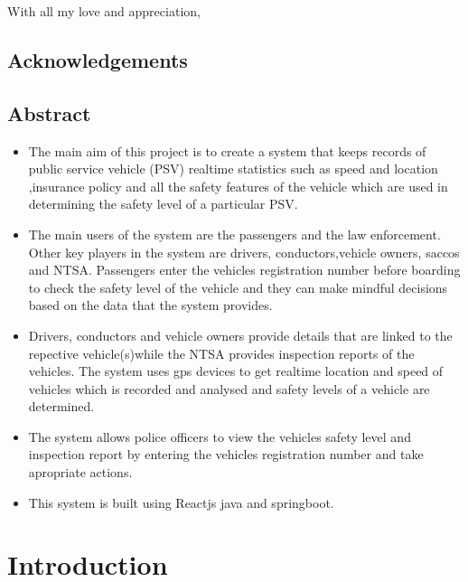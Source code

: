 \documentclass[a4paper, 12pt]{report}
\begin{document}
With all my love and appreciation,
\clearpage

\section{Acknowledgements}
\clearpage

\section{Abstract}
\begin{itemize}
\item The main aim of this project is to create a system that keeps records of
public service vehicle (PSV) realtime statistics such as speed and location
,insurance policy and all the safety features of the vehicle which are used in
determining the safety level of a particular PSV.
\item The main users of the system are the passengers and the law enforcement.
Other key players in the system are drivers, conductors,vehicle owners, saccos and NTSA. Passengers enter the vehicles registration number before
boarding to check the safety level of the vehicle and they can make mindful
decisions based on the data that the system provides.

\item Drivers, conductors and vehicle owners provide details that are linked to
the repective vehicle(s)while the NTSA provides inspection reports of the
vehicles. The system uses gps devices to get realtime location and speed
of vehicles which is recorded and analysed and safety levels of a vehicle are
determined.
\item The system allows police officers to view the vehicles safety level and inspection report by entering the vehicles registration number and take apropriate
actions.
\item This system is built using Reactjs  java and springboot.
\end{itemize}
\clearpage
\thispagestyle{empty}
\tableofcontents
\clearpage
\thispagestyle{empty}
\listoffigures
\clearpage

\chapter{Introduction}
\end{document}
